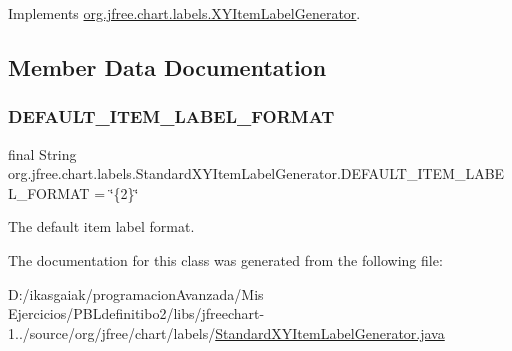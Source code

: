 Implements \mbox{\hyperlink{interfaceorg_1_1jfree_1_1chart_1_1labels_1_1_x_y_item_label_generator_aced931506ef5a2a355b8846534ad457e}{org.\+jfree.\+chart.\+labels.\+X\+Y\+Item\+Label\+Generator}}.



\subsection{Member Data Documentation}
\mbox{\label{classorg_1_1jfree_1_1chart_1_1labels_1_1_standard_x_y_item_label_generator_a37bc6bdfd180e6cc3177631ed9f223cd}} 
\subsubsection{\texorpdfstring{D\+E\+F\+A\+U\+L\+T\+\_\+\+I\+T\+E\+M\+\_\+\+L\+A\+B\+E\+L\+\_\+\+F\+O\+R\+M\+AT}{DEFAULT\_ITEM\_LABEL\_FORMAT}}
{\footnotesize\ttfamily final String org.\+jfree.\+chart.\+labels.\+Standard\+X\+Y\+Item\+Label\+Generator.\+D\+E\+F\+A\+U\+L\+T\+\_\+\+I\+T\+E\+M\+\_\+\+L\+A\+B\+E\+L\+\_\+\+F\+O\+R\+M\+AT = \char`\"{}\{2\}\char`\"{}\hspace{0.3cm}{\ttfamily [static]}}

The default item label format. 

The documentation for this class was generated from the following file\+:\begin{DoxyCompactItemize}
\item 
D\+:/ikasgaiak/programacion\+Avanzada/\+Mis Ejercicios/\+P\+B\+Ldefinitibo2/libs/jfreechart-\/1../source/org/jfree/chart/labels/\mbox{\hyperlink{_standard_x_y_item_label_generator_8java}{Standard\+X\+Y\+Item\+Label\+Generator.\+java}}\end{DoxyCompactItemize}
